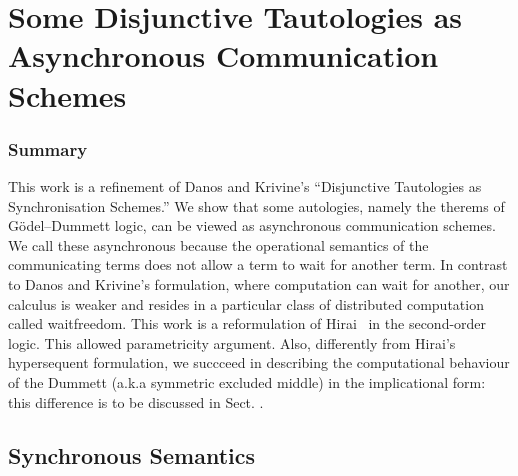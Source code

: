 \chapter{Some Disjunctive Tautologies as
  Asynchronous Communication Schemes}




% 


\subsection{Summary}
This work is a refinement of
Danos and Krivine's ``Disjunctive Tautologies as
Synchronisation Schemes.''
We show that some autologies,
namely the therems of G\"odel--Dummett logic,
can be viewed as asynchronous communication schemes.
We call these asynchronous because the operational semantics
of the communicating terms does not allow a term to wait for another
term.
In contrast to Danos and Krivine's  formulation,
where computation can wait for another,
our calculus is weaker and resides in a particular class of
distributed computation called waitfreedom.
This work is a reformulation of Hirai~ in the
second-order logic.
This allowed parametricity argument.
Also, differently from Hirai's  hypersequent formulation,
we succceed in describing the computational behaviour of the Dummett
(a.k.a symmetric excluded middle) in the implicational form: this
difference is to be discussed in Sect. .




\section{Synchronous Semantics}

